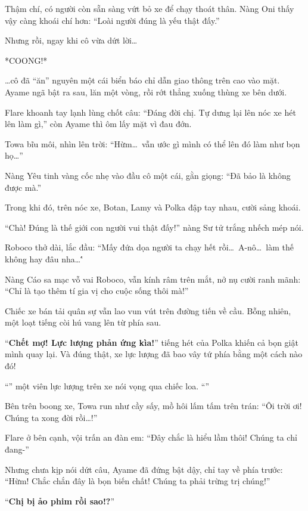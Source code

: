 \documentclass[../main.tex]{subfiles}
\begin{document}
Thậm chí, có người còn sẵn sàng vứt bỏ xe để chạy thoát thân. Nàng Oni thấy vậy càng khoái chí hơn: ``Loài người đúng là yếu thật đấy.''

Nhưng rồi, ngay khi cô vừa dứt lời\dots

*COONG!*

\dots cô đã ``ăn'' nguyên một cái biển báo chỉ dẫn giao thông trên cao vào mặt. Ayame ngã bật ra sau, lăn một vòng, rồi rớt thẳng xuống thùng xe bên dưới.

Flare khoanh tay lạnh lùng chốt câu: ``Đáng đời chị. Tự dưng lại lên nóc xe hét lên làm gì,'' còn Ayame thì ôm lấy mặt vì đau đớn.

Towa bĩu môi, nhìn lên trời: ``Hừm\dots\ vẫn ước gì mình có thể lên đó làm như bọn họ\dots''

Nàng Yêu tinh vàng cốc nhẹ vào đầu cô một cái, gằn giọng: ``Đã bảo là không được mà.''

Trong khi đó, trên nóc xe, Botan, Lamy và Polka đập tay nhau, cười sảng khoái.

``Chà! Đúng là thế giới con người vui thật đấy!'' nàng Sư tử trắng nhếch mép nói.

Roboco thở dài, lắc đầu: ``Mấy đứa dọa người ta chạy hết rồi\dots\ A-nô\dots\ làm thế không hay đâu nha\dots\''

Nàng Cáo sa mạc vỗ vai Roboco, vẫn kính râm trên mắt, nở nụ cười ranh mãnh: ``Chỉ là tạo thêm tí gia vị cho cuộc sống thôi mà!''

Chiếc xe bán tải quân sự vẫn lao vun vút trên đường tiến về cầu. Bỗng nhiên, một loạt tiếng còi hú vang lên từ phía sau.

``\textbf{Chết mợ! Lực lượng phản ứng kìa!}'' tiếng hét của Polka khiến cả bọn giật mình quay lại. Và đúng thật, xe lực lượng đã bao vây tứ phía bằng một cách nào đó!

``'' một viên lực lượng trên xe nói vọng qua chiếc loa. ``''

Bên trên boong xe, Towa run như cầy sấy, mồ hôi lấm tấm trên trán: ``Ôi trời ơi! Chúng ta xong đời rồi\dots!''

Flare ở bên cạnh, vội trấn an đàn em: ``Đây chắc là hiểu lầm thôi! Chúng ta chỉ đang-''

Nhưng chưa kịp nói dứt câu, Ayame đã đứng bật dậy, chỉ tay về phía trước: ``Hừm! Chắc chắn đây là bọn biến chất! Chúng ta phải trừng trị chúng!''

``\textbf{Chị bị ảo phim rồi sao!?}''
\end{document}
